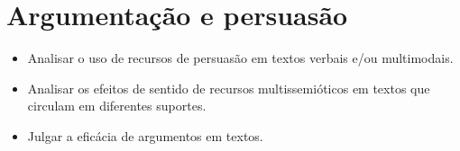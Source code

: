 \chapter{Argumentação e persuasão}


\begin{itemize}
\item Analisar o uso de recursos de persuasão em textos verbais e/ou
multimodais.

\item Analisar os efeitos de sentido de recursos multissemióticos em textos
que circulam em diferentes suportes.

\item Julgar a eficácia de argumentos em textos.
\end{itemize}

